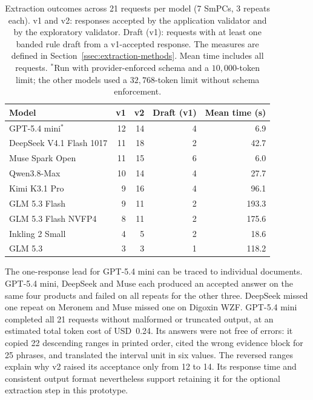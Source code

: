 \documentclass[12pt,a4paper,twoside]{book}
\begin{document}
\begin{table}[htbp]
    \centering
    \caption[Extraction outcomes by model]{Extraction outcomes across 21 requests per model (7 SmPCs, 3 repeats each). v1 and v2: responses accepted by the application validator and by the exploratory validator. Draft (v1): requests with at least one banded rule draft from a v1-accepted response. The measures are defined in Section~\ref{ssec:extraction-methods}. Mean time includes all requests. \(^{*}\)Run with provider-enforced schema and a \(10{,}000\)-token limit; the other models used a \(32{,}768\)-token limit without schema enforcement.}
    \label{tab:extraction-model-comparison}
    \begin{tabular}{@{}lrrrr@{}}
        \toprule
        Model & v1 & v2 & Draft (v1) & Mean time (s) \\
        \midrule
        GPT-5.4 mini\(^{*}\)     & 12 & 14 & 4 &   6.9 \\
        DeepSeek V4.1 Flash 1017 & 11 & 18 & 2 &  42.7 \\
        Muse Spark Open         & 11 & 15 & 6 &   6.0 \\
        Qwen3.8-Max             & 10 & 14 & 4 &  27.7 \\
        Kimi K3.1 Pro           &  9 & 16 & 4 &  96.1 \\
        GLM 5.3 Flash           &  9 & 11 & 2 & 193.3 \\
        GLM 5.3 Flash NVFP4     &  8 & 11 & 2 & 175.6 \\
        Inkling 2 Small         &  4 &  5 & 2 &  18.6 \\
        GLM 5.3                 &  3 &  3 & 1 & 118.2 \\
        \bottomrule
    \end{tabular}
\end{table}

The one-response lead for GPT-5.4 mini can be traced to individual documents.
GPT-5.4 mini, DeepSeek and Muse each produced an accepted answer on the same four products and failed on all repeats for the other three.
DeepSeek missed one repeat on Meronem and Muse missed one on Digoxin WZF.
GPT-5.4 mini completed all 21 requests without malformed or truncated output, at an estimated total token cost of USD~0.24.
Its answers were not free of errors: it copied 22 descending ranges in printed order, cited the wrong evidence block for 25 phrases, and translated the interval unit in six values.
The reversed ranges explain why v2 raised its acceptance only from 12 to 14.
Its response time and consistent output format nevertheless support retaining it for the optional extraction step in this prototype.
\end{document}
